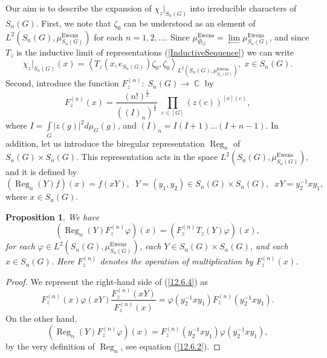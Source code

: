 \documentclass[12pt]{amsart}
\newtheorem{prop}[thm]{Proposition}
\theoremstyle{definition}
\numberwithin{equation}{section}
\DeclareMathOperator{\C}{\mathbb{C}}
\DeclareMathOperator{\Ewens}{Ewens}
\DeclareMathOperator{\Reg}{Reg}
\begin{document}
Our aim is to describe the expansion of $\chi_z|_{S_n(G)}$  into irreducible characters of $S_n(G)$. First, we note that $\zeta_0$ can be understood as an element of $L^2\left(S_n(G),\mu^{\Ewens}_{S_n(G)}\right)$
for each $n=1,2,\ldots$. Since $\mu_{\mathfrak{S}_G}^{\Ewens}=
\underset{\longleftarrow}{\lim}\mu_{S_n(G)}^{\Ewens}$, and since
$T_z$ is the inductive limit of representations  (\ref{InductiveSequence})
we can write
\begin{equation}\label{12.5.1}
\chi_z|_{S_n(G)}(x)=\left<T_z\left(x,e_{S_n(G)}\right)\zeta_0,\zeta_0\right>_{
L^2\left(S_n(G),\mu^{\Ewens}_{S_n(G)}\right)},\; x\in S_n(G).
\end{equation}
Second, introduce the function $F_z^{(n)}:\; S_n(G)\longrightarrow\C$ by
\begin{equation}\label{12.6.1}
F_z^{(n)}(x)=\frac{\left(n!\right)^{\frac{1}{2}}}{\left(\left(I\right)_n\right)^{\frac{1}{2}}}\;\prod\limits_{c\in [G]}
\left(z(c)\right)^{[x](c)},
\end{equation}
where $I=\int\limits_{G}|z(g)|^2d\mu_G(g)$, and $(I)_n=I(I+1)\ldots (I+n-1)$. In addition, let us introduce
the biregular representation $\Reg_n$ of $S_n(G)\times S_n(G)$. This representation acts in the space
$L^2\left(S_n(G),\mu_{S_n(G)}^{\Ewens}\right)$, and it is defined by
\begin{equation}\label{12.6.2}
\left(\Reg_n(Y)f\right)(x)=f(xY),\;\;Y=(y_1,y_2)\in S_n(G)\times S_n(G),\;\; xY=y_2^{-1}xy_1,
\end{equation}
where $x\in S_n(G)$.
\begin{prop}\label{Prop12.6.3}
We have
\begin{equation}\label{12.6.4}
\left(\Reg_n(Y)F_z^{(n)}\varphi\right)(x)=\left(F_z^{(n)}T_z(Y)\varphi\right)(x),
\end{equation}
for each $\varphi\in L^2\left(S_n(G),\mu_{S_n(G)}^{\Ewens}\right)$, each $Y\in S_n(G)\times S_n(G)$, and each $x\in S_n(G)$. Here $F_z^{(n)}$ denotes the operation of multiplication by $F_z^{(n)}(x)$.
\end{prop}
\begin{proof} We represent the right-hand side of (\ref{12.6.4}) as
$$
F_z^{(n)}(x)\varphi\left(xY\right)\frac{F_z^{(n)}(xY)}{F_z^{(n)}(x)}=
\varphi\left(y_2^{-1}xy_1\right)F_z^{(n)}\left(y_2^{-1}xy_1\right).
$$
On the other hand,
$$
\left(\Reg_n(Y)F_z^{(n)}\varphi\right)(x)=F_z^{(n)}\left(y_2^{-1}xy_1\right)\varphi\left(y_2^{-1}xy_1\right),
$$
by the very definition of $\Reg_n$, see equation (\ref{12.6.2}).
\end{proof}
\end{document}
